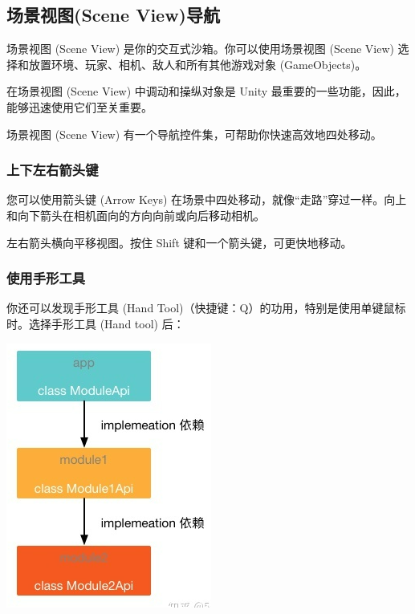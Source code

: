 \documentclass[9pt, b5paper]{article}
\begin{document}
\subsection{场景视图(Scene View)导航}
\label{sec:org53c21b7}
场景视图 (Scene View) 是你的交互式沙箱。你可以使用场景视图 (Scene View) 选择和放置环境、玩家、相机、敌人和所有其他游戏对象 (GameObjects)。

在场景视图 (Scene View) 中调动和操纵对象是 Unity 最重要的一些功能，因此，能够迅速使用它们至关重要。

场景视图 (Scene View) 有一个导航控件集，可帮助你快速高效地四处移动。

\subsubsection{上下左右箭头键}
\label{sec:orgf2f5e52}

您可以使用箭头键 (Arrow Keys) 在场景中四处移动，就像“走路”穿过一样。向上和向下箭头在相机面向的方向向前或向后移动相机。

左右箭头横向平移视图。按住 Shift 键和一个箭头键，可更快地移动。

\subsubsection{使用手形工具}
\label{sec:orgee5c0a8}

你还可以发现手形工具 (Hand Tool)（快捷键：Q）的功用，特别是使用单键鼠标时。选择手形工具 (Hand tool) 后：

\begin{center}
\includegraphics[width=.9\linewidth]{./pic/1.png}
\end{center}
\end{document}
